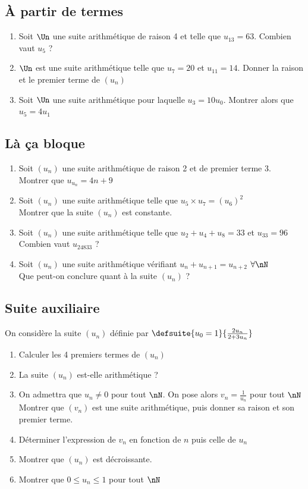 \documentclass[oneside,12pt]{book}          %
\begin{document}
\subsection{À partir de termes}
\begin{enumerate}
    \item Soit $\Un$ une suite arithmétique de raison 4 et telle que $u_{13}=63$. Combien vaut $u_{5}$ ? 
    \item $\Un$ est une suite arithmétique telle que $u_{7}=20$ et $u_{11}=14$. Donner la raison et le premier terme de $(u_n)$
	\item Soit $\Un$ une suite arithmétique pour laquelle $u_3=10u_0$. Montrer alors que $u_5=4u_1$
\end{enumerate}



\subsection{Là ça bloque}
\begin{enumerate}
	\item Soit $(u_n)$ une suite arithmétique de raison 2 et de premier terme 3.\\
	Montrer que $u_{u_n}=4n+9$
	\item Soit $(u_n)$ une suite arithmétique telle que $u_5\times u_7=(u_6)^2$\\
	Montrer que la suite $(u_n)$ est constante.
	\item Soit $(u_n)$ une suite arithmétique telle que $u_2+u_4+u_8=33$ et $u_{33}=96$\\
	Combien vaut $u_{24833}$ ?
	\item Soit $(u_n)$ une suite arithmétique vérifiant $u_n+u_{n+1}=u_{n+2}$ \quad $\forall\nN$\\
	Que peut-on conclure quant à la suite $(u_n)$ ?
\end{enumerate}



\subsection{Suite auxiliaire}
On considère la suite $(u_n)$ définie par $\defsuite{u_{0}=1}{\frac{2u_n}{2+3u_n}}$

\begin{enumerate}
    \item Calculer les 4 premiers termes de $(u_n)$
    \item La suite $(u_n)$ est-elle arithmétique ?
    \item On admettra que $u_n\neq 0$ pour tout $\nN$. On pose alors $v_{n}=\frac{1}{u_n}$ pour tout $\nN$
    Montrer que $(v_{n})$ est une suite arithmétique, puis donner sa raison et son premier terme.
    \item Déterminer l'expression de $v_{n}$ en fonction de $n$ puis celle de $u_n$
    \item Montrer que $(u_n)$ est décroissante.
    \item Montrer que $0\leq u_n\leq 1$ pour tout $\nN$
\end{enumerate}
\end{document}
